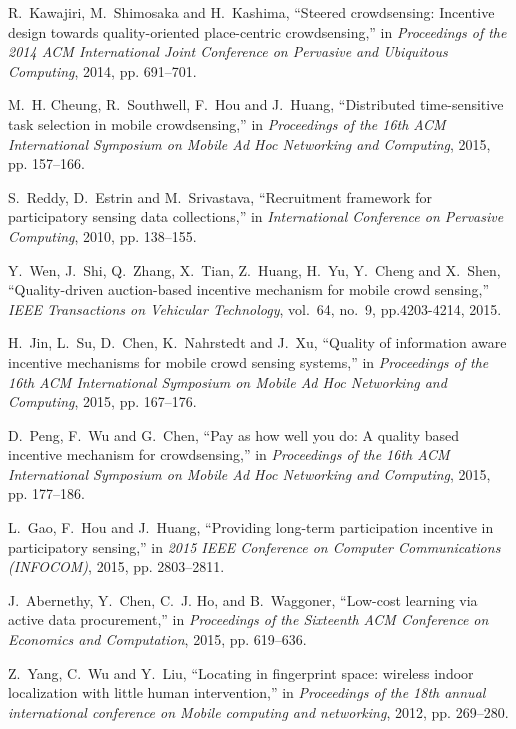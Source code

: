 \documentclass[10pt,conference,compsocconf,letterpaper]{IEEEtran}
\begin{document}
\begin{thebibliography}{99}
R.~Kawajiri, M.~Shimosaka and H.~Kashima, ``Steered crowdsensing: Incentive design towards quality-oriented place-centric crowdsensing,'' in \emph{Proceedings of the 2014 ACM International Joint Conference on Pervasive and Ubiquitous Computing}, 2014, pp. 691--701.

M.~H. Cheung, R.~Southwell, F.~Hou and J.~Huang, ``Distributed time-sensitive task selection in mobile crowdsensing,'' in \emph{Proceedings of the 16th ACM International Symposium on Mobile Ad Hoc Networking and Computing}, 2015, pp. 157--166.

S.~Reddy, D.~Estrin and M.~Srivastava, ``Recruitment framework for participatory sensing data collections,'' in \emph{International Conference on Pervasive Computing}, 2010, pp. 138--155.

Y.~Wen, J.~Shi, Q.~Zhang, X.~Tian, Z.~Huang, H.~Yu, Y.~Cheng and X.~Shen, ``Quality-driven auction-based incentive mechanism for mobile crowd sensing,'' \emph{IEEE Transactions on Vehicular Technology}, vol.~64, no.~9, pp.4203-4214, 2015.

H.~Jin, L.~Su, D.~Chen, K.~Nahrstedt and J.~Xu, ``Quality of information aware incentive mechanisms for mobile crowd sensing systems,'' in \emph{Proceedings of the 16th ACM International Symposium on Mobile Ad Hoc Networking and Computing}, 2015, pp. 167--176.

D.~Peng, F.~Wu and G.~Chen, ``Pay as how well you do: A quality based incentive mechanism for crowdsensing,'' in \emph{Proceedings of the 16th ACM International Symposium on Mobile Ad Hoc Networking and Computing}, 2015, pp. 177--186.

L.~Gao, F.~Hou and J.~Huang, ``Providing long-term participation incentive in participatory sensing,'' in \emph{2015 IEEE Conference on Computer Communications (INFOCOM)}, 2015, pp. 2803--2811.

J.~Abernethy, Y.~Chen, C.~J. Ho, and B.~Waggoner, ``Low-cost learning via active data procurement,'' in \emph{Proceedings of the Sixteenth ACM Conference on Economics and Computation}, 2015, pp. 619--636.

Z.~Yang, C.~Wu and Y.~Liu, ``Locating in fingerprint space: wireless indoor localization with little human intervention,'' in \emph{Proceedings of the 18th annual international conference on Mobile computing and networking}, 2012, pp. 269--280.


\end{thebibliography}
\end{document}
